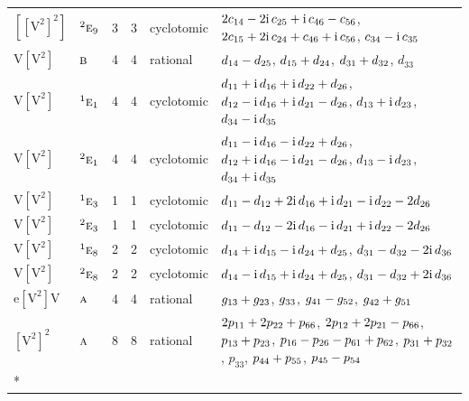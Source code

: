 \documentclass[10pt,a4paper]{article}
\numberwithin{equation}{section}
\newcommand{\irr}[1]{\text{\normalfont\scshape #1}}
\newcommand{\conjpair}[1]{{}^{#1}}
\newcommand{\iunit}{\mathrm{i}}
\newcommand{\jahn}[1]{\mathrm{#1}}
\newlength{\fillwidth}\newlength{\cellwidth}\newlength{\colwidth}
\newcommand{\signbreak}{\penalty100\relax}
\begin{document}
{\begin{longtable}{@{}llrrl>{\RaggedRight\arraybackslash}p{\fillwidth}@{}}
$\jahn{[[V^{2}]^{2}]}$ & $\conjpair{2}\irr{e}_{9}$ & 3 & 3 & cyclotomic & $2c_{14} -\signbreak 2\iunit{}\,c_{25} +\signbreak \iunit{}\,c_{46} -\signbreak c_{56}$, $2c_{15} +\signbreak 2\iunit{}\,c_{24} +\signbreak c_{46} +\signbreak \iunit{}\,c_{56}$, $c_{34} -\signbreak \iunit{}\,c_{35}$\\
$\jahn{V[V^{2}]}$ & $\irr{b}$ & 4 & 4 & rational & $d_{14} -\signbreak d_{25}$, $d_{15} +\signbreak d_{24}$, $d_{31} +\signbreak d_{32}$, $d_{33}$\\
$\jahn{V[V^{2}]}$ & $\conjpair{1}\irr{e}_{1}$ & 4 & 4 & cyclotomic & $d_{11} +\signbreak \iunit{}\,d_{16} +\signbreak \iunit{}\,d_{22} +\signbreak d_{26}$, $d_{12} -\signbreak \iunit{}\,d_{16} +\signbreak \iunit{}\,d_{21} -\signbreak d_{26}$, $d_{13} +\signbreak \iunit{}\,d_{23}$, $d_{34} -\signbreak \iunit{}\,d_{35}$\\
$\jahn{V[V^{2}]}$ & $\conjpair{2}\irr{e}_{1}$ & 4 & 4 & cyclotomic & $d_{11} -\signbreak \iunit{}\,d_{16} -\signbreak \iunit{}\,d_{22} +\signbreak d_{26}$, $d_{12} +\signbreak \iunit{}\,d_{16} -\signbreak \iunit{}\,d_{21} -\signbreak d_{26}$, $d_{13} -\signbreak \iunit{}\,d_{23}$, $d_{34} +\signbreak \iunit{}\,d_{35}$\\
$\jahn{V[V^{2}]}$ & $\conjpair{1}\irr{e}_{3}$ & 1 & 1 & cyclotomic & $d_{11} -\signbreak d_{12} +\signbreak 2\iunit{}\,d_{16} +\signbreak \iunit{}\,d_{21} -\signbreak \iunit{}\,d_{22} -\signbreak 2d_{26}$\\
$\jahn{V[V^{2}]}$ & $\conjpair{2}\irr{e}_{3}$ & 1 & 1 & cyclotomic & $d_{11} -\signbreak d_{12} -\signbreak 2\iunit{}\,d_{16} -\signbreak \iunit{}\,d_{21} +\signbreak \iunit{}\,d_{22} -\signbreak 2d_{26}$\\
$\jahn{V[V^{2}]}$ & $\conjpair{1}\irr{e}_{8}$ & 2 & 2 & cyclotomic & $d_{14} +\signbreak \iunit{}\,d_{15} -\signbreak \iunit{}\,d_{24} +\signbreak d_{25}$, $d_{31} -\signbreak d_{32} -\signbreak 2\iunit{}\,d_{36}$\\
$\jahn{V[V^{2}]}$ & $\conjpair{2}\irr{e}_{8}$ & 2 & 2 & cyclotomic & $d_{14} -\signbreak \iunit{}\,d_{15} +\signbreak \iunit{}\,d_{24} +\signbreak d_{25}$, $d_{31} -\signbreak d_{32} +\signbreak 2\iunit{}\,d_{36}$\\
$\jahn{e[V^{2}]V}$ & $\irr{a}$ & 4 & 4 & rational & $\mathnormal{g}_{13} +\signbreak \mathnormal{g}_{23}$, $\mathnormal{g}_{33}$, $\mathnormal{g}_{41} -\signbreak \mathnormal{g}_{52}$, $\mathnormal{g}_{42} +\signbreak \mathnormal{g}_{51}$\\
$\jahn{[V^{2}]^{2}}$ & $\irr{a}$ & 8 & 8 & rational & $2p_{11} +\signbreak 2p_{22} +\signbreak p_{66}$, $2p_{12} +\signbreak 2p_{21} -\signbreak p_{66}$, $p_{13} +\signbreak p_{23}$, $p_{16} -\signbreak p_{26} -\signbreak p_{61} +\signbreak p_{62}$, $p_{31} +\signbreak p_{32}$, $p_{33}$, $p_{44} +\signbreak p_{55}$, $p_{45} -\signbreak p_{54}$\\*

\end{longtable}}
\end{document}
